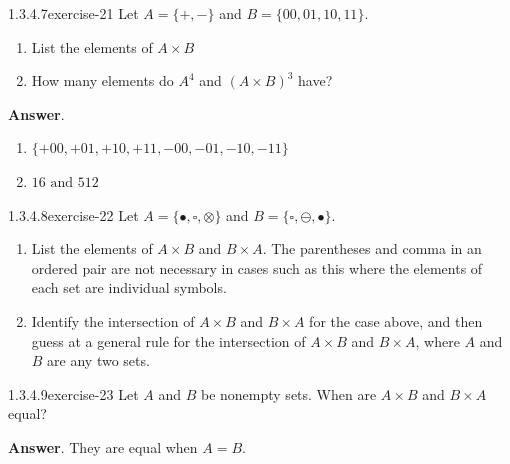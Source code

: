 \documentclass[twoside,10pt,]{book}
\numberwithin{equation}{section}
\begin{document}
\begin{divisionsolution}{1.3.4.7}{}{exercise-21}%
\hypertarget{p-379}{}%
Let \(A = \{+,-\}\) and \(B = \{00, 01, 10, 11\}\).%
\par
\hypertarget{p-380}{}%
\leavevmode%
\begin{enumerate}[label=(\alph*)]
\item\hypertarget{li-289}{}\hypertarget{p-381}{}%
List the elements of \(A \times  B\)%
\item\hypertarget{li-290}{}\hypertarget{p-382}{}%
How many elements do \(A ^4\) and \((A \times B)^3\) have?%
\end{enumerate}
%
\par\smallskip%
\noindent\textbf{Answer}.\quad%
\hypertarget{p-383}{}%
\leavevmode%
\begin{enumerate}[label=(\alph*)]
\item\hypertarget{li-291}{}\hypertarget{p-384}{}%
\(\{+00, +01, +10, +11, -00, -01, -10, -11\}\)%
\item\hypertarget{li-292}{}\hypertarget{p-385}{}%
\(16 \textrm{ and } 512\)%
\end{enumerate}
%
\end{divisionsolution}%
\begin{divisionsolution}{1.3.4.8}{}{exercise-22}%
\hypertarget{p-386}{}%
Let \(A = \{\bullet,\square ,\otimes \}\) and \(B = \{\square ,\ominus ,\bullet\}\).%
\par
\hypertarget{p-387}{}%
\leavevmode%
\begin{enumerate}[label=(\alph*)]
\item\hypertarget{li-293}{}\hypertarget{p-388}{}%
List the elements of \(A \times  B\) and \(B \times  A\). The parentheses and comma in an ordered pair are not necessary in cases such as this where the elements of each set are individual symbols.%
\item\hypertarget{li-294}{}\hypertarget{p-389}{}%
Identify the intersection of \(A \times  B\) and \(B \times  A\) for the case above, and then guess at a general rule for the intersection of \(A \times  B\) and \(B \times  A\), where \(A\) and \(B\) are any two sets.%
\end{enumerate}
%
\end{divisionsolution}%
\begin{divisionsolution}{1.3.4.9}{}{exercise-23}%
\hypertarget{p-390}{}%
Let \(A\) and \(B\) be nonempty sets. When are \(A \times  B\) and \(B \times  A\) equal?%
\par\smallskip%
\noindent\textbf{Answer}.\quad%
\hypertarget{p-391}{}%
They are equal when \(A=B\).%
\end{divisionsolution}%
\end{document}
